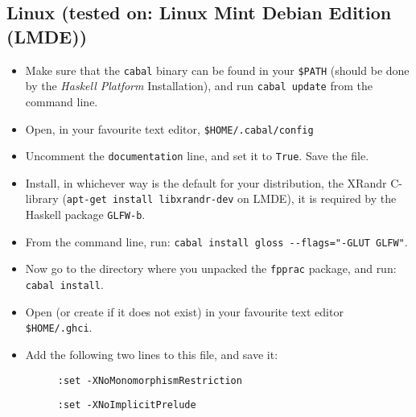 \documentclass[]{article}
\begin{document}
\subsection{Linux (tested on: Linux Mint Debian Edition (LMDE))}
\begin{itemize}
  \item Make sure that the \texttt{cabal} binary can be found in your \texttt{\$PATH} (should be done by the \emph{Haskell Platform} Installation), and run \texttt{cabal update} from the command line.
  \item Open, in your favourite text editor, \texttt{\$HOME/.cabal/config}
  \item Uncomment the \texttt{documentation} line, and set it to \texttt{True}. Save the file.
  \item Install, in whichever way is the default for your distribution, the XRandr C-library (\texttt{apt-get install libxrandr-dev} on LMDE), it is required by the Haskell package \texttt{GLFW-b}.
  \item From the command line, run: \texttt{cabal install gloss -{}-flags="-GLUT GLFW"}.
  \item Now go to the directory where you unpacked the \texttt{fpprac} package, and run: \texttt{cabal install}.
  \item Open (or create if it does not exist) in your favourite text editor \texttt{\$HOME/.ghci}.
  \item Add the following two lines to this file, and save it:
  \begin{description}
    \item[] \texttt{:set -XNoMonomorphismRestriction}
    \item[] \texttt{:set -XNoImplicitPrelude}
  \end{description}
\end{itemize}
\end{document}
